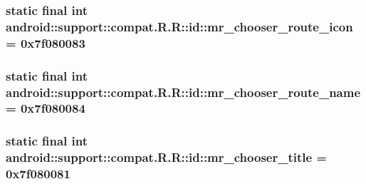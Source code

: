 \hypertarget{classandroid_1_1support_1_1compat_1_1_r_1_1id_d59770811d763e8cbef087bec69e4b3b}{
\subsubsection[{mr\_\-chooser\_\-route\_\-icon}]{\setlength{\rightskip}{0pt plus 5cm}static final int android::support::compat.R.R::id::mr\_\-chooser\_\-route\_\-icon = 0x7f080083}}
\label{classandroid_1_1support_1_1compat_1_1_r_1_1id_d59770811d763e8cbef087bec69e4b3b}


\hypertarget{classandroid_1_1support_1_1compat_1_1_r_1_1id_3fbd207d1755b44c4fd79acd773bd615}{
\subsubsection[{mr\_\-chooser\_\-route\_\-name}]{\setlength{\rightskip}{0pt plus 5cm}static final int android::support::compat.R.R::id::mr\_\-chooser\_\-route\_\-name = 0x7f080084}}
\label{classandroid_1_1support_1_1compat_1_1_r_1_1id_3fbd207d1755b44c4fd79acd773bd615}


\hypertarget{classandroid_1_1support_1_1compat_1_1_r_1_1id_1320af2360a9138f7c9c913a3ffa3e54}{
\subsubsection[{mr\_\-chooser\_\-title}]{\setlength{\rightskip}{0pt plus 5cm}static final int android::support::compat.R.R::id::mr\_\-chooser\_\-title = 0x7f080081}}
\label{classandroid_1_1support_1_1compat_1_1_r_1_1id_1320af2360a9138f7c9c913a3ffa3e54}


